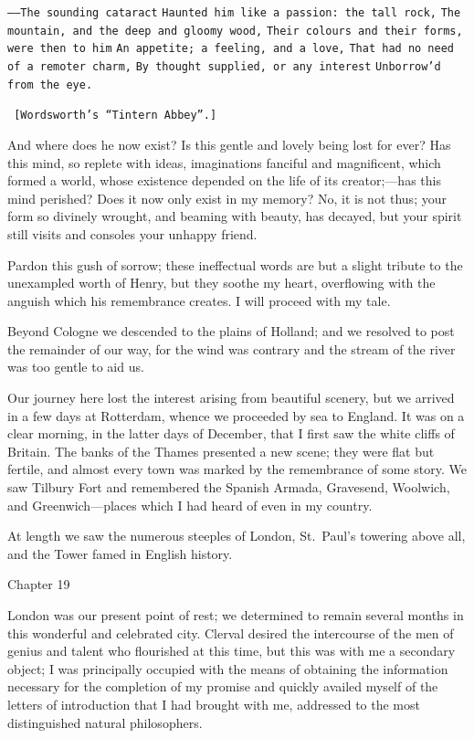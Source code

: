 \documentclass[12pt,openright]{book}
\begin{document}
\texttt{——The sounding cataract}
\texttt{Haunted him like a passion: the tall rock,}
\texttt{The mountain, and the deep and gloomy wood,}
\texttt{Their colours and their forms, were then to him}
\texttt{An appetite; a feeling, and a love,}
\texttt{That had no need of a remoter charm,}
\texttt{By thought supplied, or any interest}
\texttt{Unborrow’d from the eye.}

\texttt{      [Wordsworth’s “Tintern Abbey”.]}

And where does he now exist? Is this gentle and lovely being lost for ever? Has this mind, so replete with ideas, imaginations fanciful and magnificent, which formed a world, whose existence depended on the life of its creator;—has this mind perished? Does it now only exist in my memory? No, it is not thus; your form so divinely wrought, and beaming with beauty, has decayed, but your spirit still visits and consoles your unhappy friend.

Pardon this gush of sorrow; these ineffectual words are but a slight tribute to the unexampled worth of Henry, but they soothe my heart, overflowing with the anguish which his remembrance creates. I will proceed with my tale.

Beyond Cologne we descended to the plains of Holland; and we resolved to post the remainder of our way, for the wind was contrary and the stream of the river was too gentle to aid us.

Our journey here lost the interest arising from beautiful scenery, but we arrived in a few days at Rotterdam, whence we proceeded by sea to England. It was on a clear morning, in the latter days of December, that I first saw the white cliffs of Britain. The banks of the Thames presented a new scene; they were flat but fertile, and almost every town was marked by the remembrance of some story. We saw Tilbury Fort and remembered the Spanish Armada, Gravesend, Woolwich, and Greenwich—places which I had heard of even in my country.

At length we saw the numerous steeples of London, St. Paul’s towering above all, and the Tower famed in English history.

Chapter 19

London was our present point of rest; we determined to remain several months in this wonderful and celebrated city. Clerval desired the intercourse of the men of genius and talent who flourished at this time, but this was with me a secondary object; I was principally occupied with the means of obtaining the information necessary for the completion of my promise and quickly availed myself of the letters of introduction that I had brought with me, addressed to the most distinguished natural philosophers.
\end{document}

